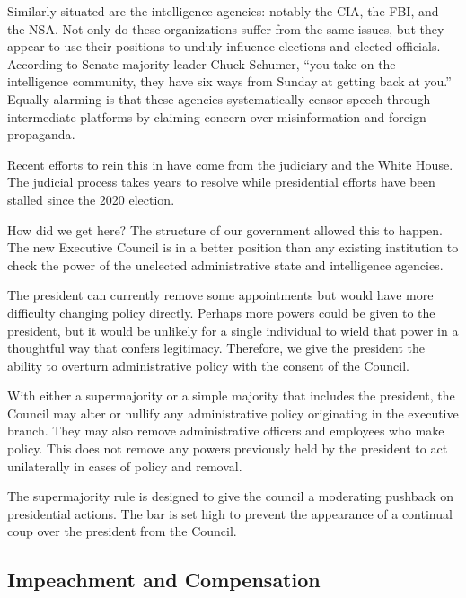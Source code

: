 \documentclass{article}
\newcommand{\quotes}[1]{``#1''}
\begin{document}
Similarly situated are the intelligence agencies: notably the CIA, the FBI, and the NSA. Not only do these organizations suffer from the same issues, but they appear to use their positions to unduly influence elections and elected officials. According to Senate majority leader Chuck Schumer\cite{Stanley}, \quotes{you take on the intelligence community, they have six ways from Sunday at getting back at you.} Equally alarming is that these agencies systematically censor speech through intermediate platforms by claiming concern over misinformation and foreign propaganda\cite{Beanz}.

Recent efforts to rein this in have come from the judiciary\cite{Crowell} and the White House\cite{ScheduleF}. The judicial process takes years to resolve while presidential efforts have been stalled since the 2020 election.

How did we get here? The structure of our government allowed this to happen. The new Executive Council is in a better position than any existing institution to check the power of the unelected administrative state and intelligence agencies.

The president can currently remove some appointments but would have more difficulty changing policy directly\cite{Fairlie}. Perhaps more powers could be given to the president, but it would be unlikely for a single individual to wield that power in a thoughtful way that confers legitimacy. Therefore, we give the president the ability to overturn administrative policy with the consent of the Council.

\begin{quoting}
With either a supermajority or a simple majority that includes the president, the Council may alter or nullify any administrative policy originating in the executive branch. They may also remove administrative officers and employees who make policy. This does not remove any powers previously held by the president to act unilaterally in cases of policy and removal.
\end{quoting}

The supermajority rule is designed to give the council a moderating pushback on presidential actions. The bar is set high to prevent the appearance of a continual coup over the president from the Council.

\subsection{Impeachment and Compensation}
\end{document}
